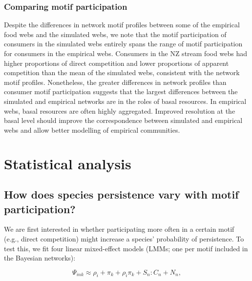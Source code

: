 \documentclass[12pt]{article}
\begin{document}
\begin{spacing}{2.0}
    
    \subsubsection*{Comparing motif participation}
      
      Despite the differences in network motif profiles between some of the empirical food webs and the simulated webs, we note that the motif participation of consumers in the simulated webs entirely spans the range of motif participation for consumers in the empirical webs.
      Consumers in the NZ stream food webs had higher proportions of direct competition and lower proportions of apparent competition than the mean of the simulated webs, consistent with the network motif profiles.
      Nonetheless, the greater differences in network profiles than consumer motif participation suggests that the largest differences between the simulated and empirical networks are in the roles of basal resources.
      In empirical webs, basal resources are often highly aggregated. 
      Improved resolution at the basal level should improve the correspondence between simulated and empirical webs and allow better modelling of empirical communities.
    

\clearpage        

        
\section{Statistical analysis}

    \subsection{How does species persistence vary with motif participation?}

        We are first interested in whether participating more often in a certain motif (e.g., direct competition) might increase a species' probability of persistence.
        To test this, we fit four linear mixed-effect models (LMMs; one per motif included in the Bayesian networks):

        \begin{equation}
            \Psi_{ink} \approx \rho_{i} + \pi_{k} + \rho_{i}\pi_{k} +
            S_{n}:C_{n} + N_n,
            \label{propreq}
        \end{equation}



\end{spacing}
\end{document}
